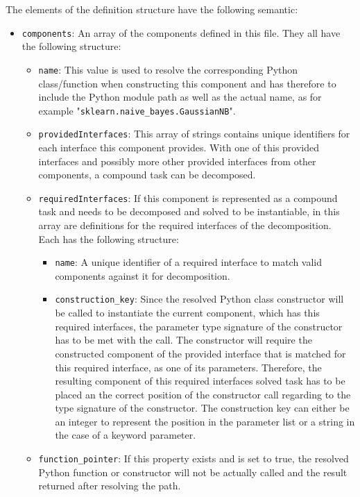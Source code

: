 The elements of the definition structure have the following semantic:
\begin{itemize}
	\item \texttt{components}: An array of the components defined in this file. They all have the following structure:
		\begin{itemize}[label=\textbullet]
			\item \texttt{name}: This value is used to resolve the corresponding Python class/function when constructing this component and has therefore to include the Python module path as well as the actual name, as for example "\texttt{sklearn.naive\_bayes.GaussianNB}".
			\item \texttt{providedInterfaces}: This array of strings contains unique identifiers for each interface this component provides. With one of this provided interfaces and possibly more other provided interfaces from other components, a compound task can be decomposed. 
            \item \texttt{requiredInterfaces}: If this component is represented as a compound task and needs to be decomposed and solved to be instantiable, in this array are definitions for the required interfaces of the decomposition. Each has the following structure:
            \begin{itemize}[label=\textbullet]
                \item \texttt{name}: A unique identifier of a required interface to match valid components against it for decomposition.
                \item \texttt{construction\_key}: Since the resolved Python class constructor will be called to instantiate the current component, which has this required interfaces, the parameter type signature of the constructor has to be met with the call.
                    The constructor will require the constructed component of the provided interface that is matched for this required interface, as one of its parameters.
                    Therefore, the resulting component of this required interfaces solved task has to be placed an the correct position of the constructor call regarding to the type signature of the constructor.
                    The construction key can either be an integer to represent the position in the parameter list or a string in the case of a keyword parameter. 
            \end{itemize}
            \item \texttt{function\_pointer}: If this property exists and is set to true, the resolved Python function or constructor will not be actually called and the result returned after resolving the path.

\end{itemize}
\end{itemize}
